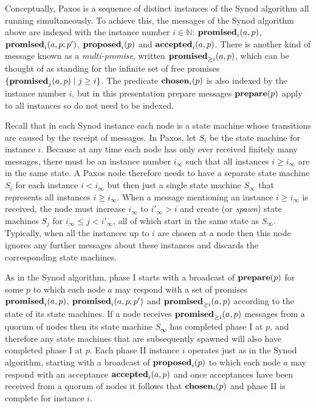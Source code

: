 \documentclass[journal]{IEEEtran}
\begin{document}
Conceptually, Paxos is a sequence of distinct instances of the Synod algorithm
all running simultaneously. To achieve this, the messages of the Synod
algorithm above are indexed with the instance number $i \in \mathbb N$:
$\mathbf{promised}_{i}(a,p)$, $\mathbf{promised}_{i}(a,p;p')$, $\mathbf{proposed}_{i}(p)$ and $\mathbf{accepted}_{i}(a,p)$.
There is another kind of message known as a \textit{multi-promise}, written
$\mathbf{promised}_{\ge i}(a,p)$, which can be thought of as standing for the infinite set of
free promises ${\{ \mathbf{promised}_{j}(a,p) \mid j \ge i \}}$. The predicate
$\mathbf{chosen}_{i}(p)$ is also indexed by the instance number $i$, but in this
presentation prepare messages $\mathbf{prepare}(p)$ apply to all instances so do not need
to be indexed.

Recall that in each Synod instance each node is a state machine whose
transitions are caused by the receipt of messages. In Paxos, let $S_i$ be the
state machine for instance $i$. Because at any time each node has only ever
received finitely many messages, there must be an instance number $i_\infty$
such that all instances $i \ge i_\infty$ are in the same state. A Paxos node
therefore needs to have a separate state machine $S_i$ for each instance $i <
i_\infty$ but then just a single state machine $S_\infty$ that represents all
instances $i \ge i_\infty$. When a message mentioning an instance $i \ge
i_\infty$ is received, the node must increase $i_\infty$ to $i'_\infty > i$ and
create (or \textit{spawn}) state machines $S_j$ for $i_\infty \le j <
i'_\infty$, all of which start in the same state as $S_\infty$. Typically, when
all the instances up to $i$ are chosen at a node then this node ignores any
further messages about these instances and discards the corresponding state
machines.

As in the Synod algorithm, phase I starts with a broadcast of $\mathbf{prepare}(p)$ for
some $p$ to which each node $a$ may respond with a set of promises
$\mathbf{promised}_{i}(a,p)$, $\mathbf{promised}_{i}(a,p;p')$ and $\mathbf{promised}_{\ge i}(a,p)$ according to the
state of its state machines. If a node receives $\mathbf{promised}_{\ge i}(a,p)$ messages from
a quorum of nodes then its state machine $S_\infty$ has completed phase I at
$p$, and therefore any state machines that are subsequently spawned will also
have completed phase I at $p$. Each phase II instance $i$ operates just as in
the Synod algorithm, starting with a broadcast of $\mathbf{proposed}_{i}(p)$ to which each
node $a$ may respond with an acceptance $\mathbf{accepted}_{i}(a,p)$ and once acceptances
have been received from a quorum of nodes it follows that $\mathbf{chosen}_{i}(p)$ and
phase II is complete for instance $i$.
\end{document}
